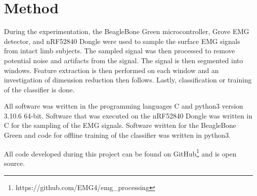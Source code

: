\section{Method}
\label{section:method}



During the experimentation, the BeagleBone Green microcontroller, Grove EMG detector, and nRF52840 Dongle were used to sample the surface EMG signals from intact limb subjects. The sampled signal was then processed to remove potential noise and artifacts from the signal. The signal is then segmented into windows. Feature extraction is then performed on each window and an investigation of dimension reduction then follows. Lastly, classification or training of the classifier is done. 

All software was written in the programming languages C and python3 version 3.10.6 64-bit. Software that was executed on the nRF52840 Dongle was written in C for the sampling of the EMG signals. Software written for the BeagleBone Green and code for offline training of the classifier was written in python3.

All code developed during this project can be found on GitHub\footnote{https://github.com/EMG4/emg\_processing} and is open source.

 

